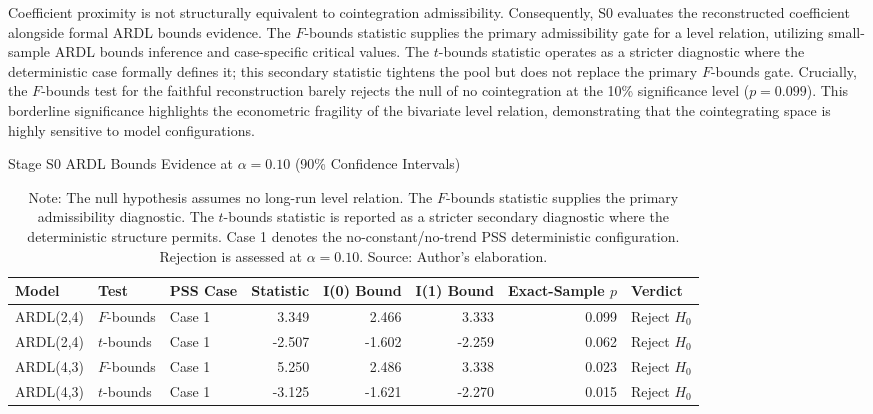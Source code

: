 \documentclass[11pt]{article}
\begin{document}
Coefficient proximity is not structurally equivalent to cointegration admissibility. Consequently, S0 evaluates the reconstructed coefficient alongside formal ARDL bounds evidence. The $F$-bounds statistic supplies the primary admissibility gate for a level relation, utilizing small-sample ARDL bounds inference and case-specific critical values. The $t$-bounds statistic operates as a stricter diagnostic where the deterministic case formally defines it; this secondary statistic tightens the pool but does not replace the primary $F$-bounds gate. Crucially, the $F$-bounds test for the faithful reconstruction barely rejects the null of no cointegration at the 10\% significance level ($p=0.099$). This borderline significance highlights the econometric fragility of the bivariate level relation, demonstrating that the cointegrating space is highly sensitive to model configurations.
\begin{table}[H]
\centering
\caption{Stage S0 ARDL Bounds Evidence at $\alpha=0.10$ (90\% Confidence Intervals)}
\label{tab:s0_bounds_alpha10}
\footnotesize
\begin{tabular}{lllrrrrl}
\toprule
Model & Test & PSS Case & Statistic & I(0) Bound & I(1) Bound & Exact-Sample $p$ & Verdict \\
\midrule
\midrule
ARDL(2,4) & $F$-bounds & Case 1 & 3.349 & 2.466 & 3.333 & 0.099 & Reject $H_0$ \\
ARDL(2,4) & $t$-bounds & Case 1 & -2.507 & -1.602 & -2.259 & 0.062 & Reject $H_0$ \\
ARDL(4,3) & $F$-bounds & Case 1 & 5.250 & 2.486 & 3.338 & 0.023 & Reject $H_0$ \\
ARDL(4,3) & $t$-bounds & Case 1 & -3.125 & -1.621 & -2.270 & 0.015 & Reject $H_0$ \\
\bottomrule
\end{tabular}
\caption*{Note: The null hypothesis assumes no long-run level relation. The $F$-bounds statistic supplies the primary admissibility diagnostic. The $t$-bounds statistic is reported as a stricter secondary diagnostic where the deterministic structure permits. Case 1 denotes the no-constant/no-trend PSS deterministic configuration. Rejection is assessed at $\alpha=0.10$. Source: Author's elaboration.}
\end{table}
\end{document}
